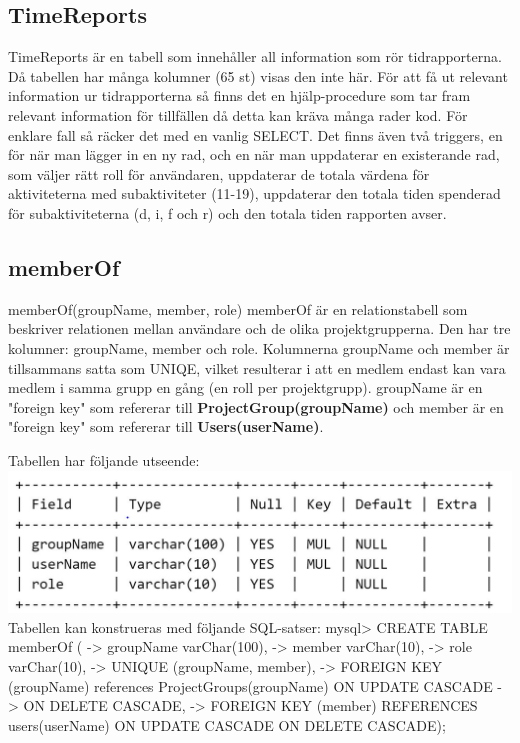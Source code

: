 \documentclass[paper=a4, fontsize=11pt,twoside]{article}
\begin{document}
\subsection{TimeReports}
 TimeReports är en tabell som innehåller all information som rör tidrapporterna. Då tabellen 
    har många kolumner (65 st) visas den inte här. För att få ut relevant information ur 
    tidrapporterna så finns det en hjälp-procedure som tar fram relevant information för tillfällen  
    då detta kan kräva många rader kod. För enklare fall så räcker det med en vanlig SELECT.
    Det finns även två triggers, en för när man lägger in en ny rad, och en när man uppdaterar 
    en existerande rad, som väljer rätt roll för användaren, uppdaterar de totala värdena för 
    aktiviteterna med subaktiviteter (11-19), uppdaterar den totala tiden spenderad för 
    subaktiviteterna (d, i, f och r) och den totala tiden rapporten avser.

\subsection{memberOf}
  memberOf(groupName, member, role)\newline
   memberOf är en relationstabell som beskriver relationen mellan användare och de olika 	      
   projektgrupperna. Den har tre kolumner: groupName, member och role. Kolumnerna  
   groupName och member är tillsammans satta som UNIQE, vilket resulterar i att en medlem 
   endast kan vara medlem i samma grupp en gång (en roll per projektgrupp). groupName är en "foreign key" som refererar till \textbf{ProjectGroup(groupName)} och member är en "foreign key" som refererar till \textbf{Users(userName)}.\newline

   Tabellen har följande utseende:\newline
\includegraphics{memberOfTable}
\newline
\newline
Tabellen kan konstrueras med följande SQL-satser:\newline
mysql> CREATE TABLE memberOf (\newline
    -> groupName varChar(100),\newline
    -> member varChar(10),\newline
    -> role varChar(10),\newline
    -> UNIQUE (groupName, member),\newline
    -> FOREIGN KEY (groupName) references ProjectGroups(groupName) ON UPDATE CASCADE\newline
    -> ON DELETE CASCADE,\newline
    -> FOREIGN KEY (member) REFERENCES users(userName) ON UPDATE CASCADE ON DELETE CASCADE);\newline
\end{document}

